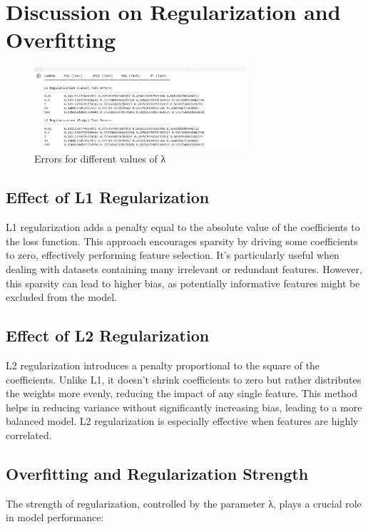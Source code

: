 \documentclass{article}
\begin{document}
\section{Discussion on Regularization and Overfitting}

\begin{figure}[h]
    \centering
    \includegraphics[width=0.7\textwidth]{diff_lambda.png} %
    \caption{Errors for different values of λ}
    \label{fig:diff_lambda}
\end{figure}

\subsection{Effect of L1 Regularization}
L1 regularization adds a penalty equal to the absolute value of the coefficients to the loss function. This approach encourages sparsity by driving some coefficients to zero, effectively performing feature selection. It's particularly useful when dealing with datasets containing many irrelevant or redundant features. However, this sparsity can lead to higher bias, as potentially informative features might be excluded from the model.

\subsection{Effect of L2 Regularization}
L2 regularization introduces a penalty proportional to the square of the coefficients. Unlike L1, it doesn't shrink coefficients to zero but rather distributes the weights more evenly, reducing the impact of any single feature. This method helps in reducing variance without significantly increasing bias, leading to a more balanced model. L2 regularization is especially effective when features are highly correlated.


\subsection{Overfitting and Regularization Strength}
The strength of regularization, controlled by the parameter 
λ, plays a crucial role in model performance:
\end{document}
